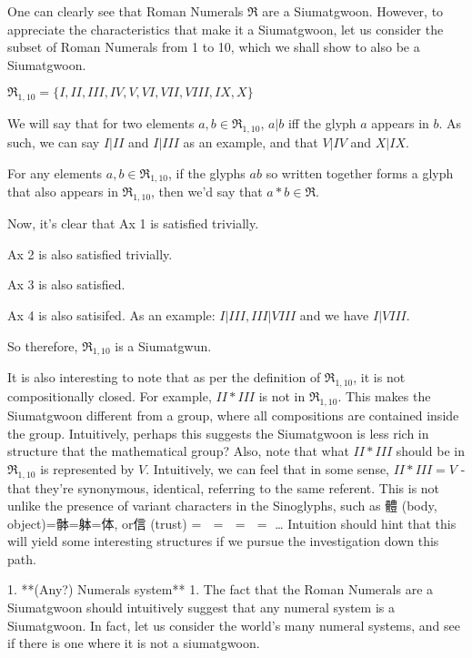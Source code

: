         One can clearly see that Roman Numerals $\mathfrak{R}$ are a Siumatgwoon. However, to appreciate the characteristics that make it a Siumatgwoon, let us consider the subset of Roman Numerals from 1 to 10, which we shall show to also be a Siumatgwoon.
        
        $\mathfrak{R}_{1,10} = \{I, II, III, IV, V, VI, VII, VIII, IX, X\}$
        
        We will say that for two elements $a,b \in \mathfrak{R}_{1,10}$, $a|b$ iff the glyph $a$ appears in $b$. As such, we can say $I | II$ and $I|III$ as an example, and that $V|IV$ and $X|IX$. 
        
        For any elements $a,b\in \mathfrak{R}_{1,10}$, if the glyphs $ab$ so written together forms a glyph that also appears in $\mathfrak{R}_{1,10}$, then we’d say that $a*b\in \mathfrak{R}$.
        
        Now, it’s clear that Ax 1 is satisfied trivially. 
        
        Ax 2 is also satisfied trivially.
        
        Ax 3 is also satisfied. 
        
        Ax 4 is also satisifed. As an example: $I | III, III | VIII$ and we have $I|VIII$.
        
        So therefore, $\mathfrak{R}_{1,10}$ is a Siumatgwun. 
        
        It is also interesting to note that as per the definition of $\mathfrak{R}_{1,10}$, it is not compositionally closed. For example, $II * III$ is not in $\mathfrak{R}_{1,10}$. This makes the Siumatgwoon different from a group, where all compositions are contained inside the group. Intuitively, perhaps this suggests the Siumatgwoon is less rich in structure that the mathematical group? Also, note that what $II * III$ should be in $\mathfrak{R}_{1,10}$ is represented by $V$. Intuitively, we can feel that in some sense, $II * III = V$ - that they’re synonymous, identical, referring to the same referent. This is not unlike the presence of variant characters in the Sinoglyphs, such as 體 (body, object)=骵=躰=体, or信 (trust) = 𬢭 = 伩 = 訫 = 㐰… Intuition should hint that this will yield some interesting structures if we pursue the investigation down this path.
        
    
    1. **(Any?) Numerals system** 
        1. The fact that the Roman Numerals are a Siumatgwoon should intuitively suggest that any numeral system is a Siumatgwoon. In fact, let us consider the world’s many numeral systems, and see if there is one where it is not a siumatgwoon. 
        
